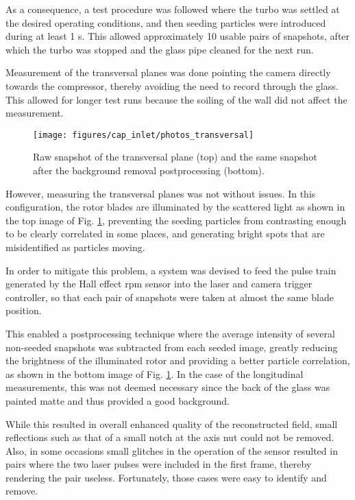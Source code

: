 As a consequence, a test procedure was followed where the turbo was settled at the desired operating conditions, and then seeding particles were introduced during at least 1 s. This allowed approximately 10 usable pairs of snapshots, after which the turbo was stopped and the glass pipe cleaned for the next run.

Measurement of the transversal planes was done pointing the camera directly towards the compressor, thereby avoiding the need to record through the glass. This allowed for longer test runs because the soiling of the wall did not affect the measurement.

\begin{figure}[!t]
\centering
\texttt{[image: figures/cap\_inlet/photos\_transversal]}
\caption{Raw snapshot of the transversal plane (top) and the same snapshot after the background removal postprocessing (bottom).}
\label{fig:photos_transversal}
\end{figure}

However, measuring the transversal planes was not without issues. In this configuration, the rotor blades are illuminated by the scattered light as shown in the top image of Fig. \ref{fig:photos_transversal}, preventing the seeding particles from contrasting enough to be clearly correlated in some places, and generating bright spots that are misidentified as particles moving.

In order to mitigate this problem, a system was devised to feed the pulse train generated by the Hall effect rpm sensor into the laser and camera trigger controller, so that each pair of snapshots were taken at almost the same blade position.

This enabled a postprocessing technique where the average intensity of several non-seeded snapshots was subtracted from each seeded image, greatly reducing the brightness of the illuminated rotor and providing a better particle correlation, as shown in the bottom image of Fig. \ref{fig:photos_transversal}. In the case of the longitudinal measurements, this was not deemed necessary since the back of the glass was painted matte and thus provided a good background.

While this resulted in overall enhanced quality of the reconstructed field, small reflections such as that of a small notch at the axis nut could not be removed. Also, in some occasions small glitches in the operation of the sensor resulted in pairs where the two laser pulses were included in the first frame, thereby rendering the pair useless. Fortunately, those cases were easy to identify and remove.

